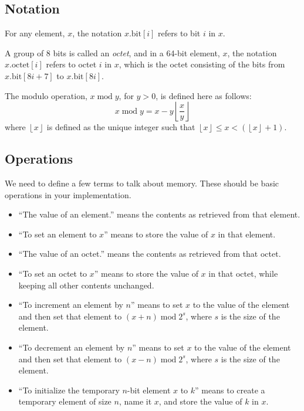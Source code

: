 \documentclass[a4paper,12pt]{article}
\newcommand{\octno}[2]{#1.\mathrm{octet}[#2]}
\newcommand{\bitno}[2]{#1.\mathrm{bit}[#2]}
\DeclareMathOperator{\MOD}{mod}
\newcommand{\modulo}[2]{#1 \MOD #2}
\begin{document}
\subsection{Notation}

For any element, $x$, the notation $\bitno{x}{i}$ refers to bit $i$ in $x$.

A group of 8 bits is called an \emph{octet}, and in a 64-bit element, $x$, the notation $\octno{x}{i}$ refers to octet $i$ in $x$, which is the octet consisting of the bits from $\bitno{x}{8i+7}$ to $\bitno{x}{8i}$.

The modulo operation, $\modulo{x}{y}$, for $y>0$, is defined here as follows:
\[ \modulo{x}{y} = x - y \left \lfloor \frac{x}{y} \right \rfloor \]
where $\left \lfloor x \right \rfloor$ is defined as the unique integer such that $\left \lfloor x \right \rfloor \le x < (\left \lfloor x \right \rfloor + 1)$.
    
\subsection{Operations}
\label{sec:memory-operations}

We need to define a few terms to talk about memory.
These should be basic operations in your implementation.
\begin{itemize}
\item ``The value of an element.'' means the contents as retrieved from that element.
\item ``To set an element to $x$'' means to store the value of $x$ in that element.
\item ``The value of an octet.'' means the contents as retrieved from that octet.
\item ``To set an octet to $x$'' means to store the value of $x$ in that octet, while keeping all other contents unchanged.
\item ``To increment an element by $n$'' means to set $x$ to the value of the element and then set that element to $\modulo{(x + n)}{2^s}$, where $s$ is the size of the element.
\item ``To decrement an element by $n$'' means to set $x$ to the value of the element and then set that element to $\modulo{(x - n)}{2^s}$, where $s$ is the size of the element.
\item  ``To initialize the temporary $n$-bit element $x$ to $k$'' means to create a temporary element of size $n$, name it $x$, and store the value of $k$ in $x$.
\end{itemize}
\end{document}
